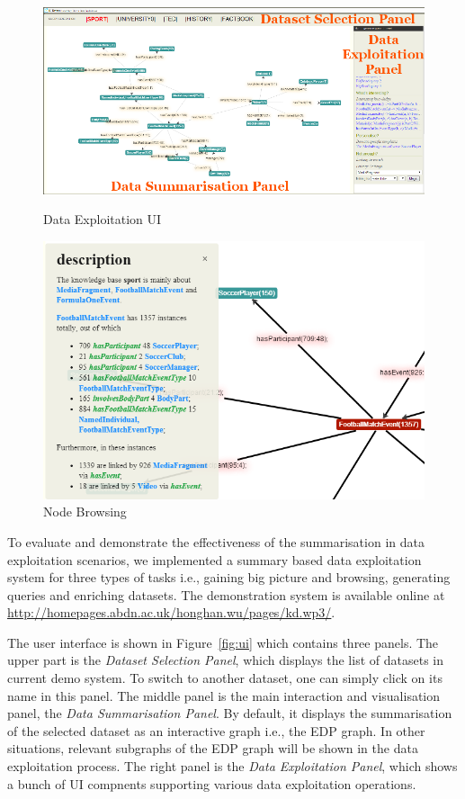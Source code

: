 
\begin{figure}
  \includegraphics[scale=0.30, trim=12mm 1mm 5cm 1cm]{figures/ui_general_annotated.png}
 \caption{Data Exploitation UI}\label{fig:ui}
\endminipage\hfill
{}
  \includegraphics[scale=0.30]{figures/node.png}
  \caption{Node Browsing}\label{fig:node}
\endminipage
\end{figure}
\vspace{-2mm}
To evaluate and demonstrate the effectiveness of the summarisation in data exploitation scenarios, we implemented a summary based data exploitation system for three types of tasks i.e., gaining big picture and browsing, generating queries and enriching datasets. The demonstration system is available online at \url{http://homepages.abdn.ac.uk/honghan.wu/pages/kd.wp3/}.

The user interface is shown in Figure~\ref{fig:ui} which contains three panels. The upper part is the \emph{Dataset Selection Panel}, which displays the list of datasets in current demo system. To switch to another dataset, one can simply click on its name in this panel. The middle panel is the main interaction and visualisation panel, the \emph{Data Summarisation Panel}. By default, it displays the summarisation of the selected dataset as an interactive graph i.e., the EDP graph. In other situations, relevant subgraphs of the EDP graph will be shown in the data exploitation process. The right panel is the \emph{Data Exploitation Panel}, which shows a bunch of UI compnents supporting various data exploitation operations.

